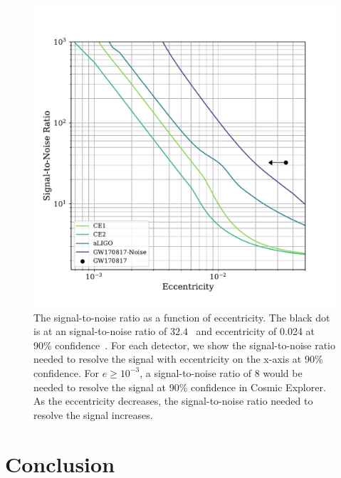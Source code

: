 \begin{figure}
    \includegraphics[width=1.1\columnwidth]{Figures/3G-bns-search-prospects/SNR-loglog-e7.pdf}
    \caption{The signal-to-noise ratio as a function of eccentricity. The black dot is at an signal-to-noise ratio of $32.4$~\cite{TheLIGOScientific:2017qsa} and eccentricity of 0.024 at 90\% confidence~\cite{Lenon:2020oza}. For each detector, we show the signal-to-noise ratio needed to resolve the signal with eccentricity on the x-axis at 90\% confidence. For $e \geq 10^{-3}$, a signal-to-noise ratio of 8 would be needed to resolve the signal at 90\% confidence in Cosmic Explorer. As the eccentricity decreases, the signal-to-noise ratio needed to resolve the signal increases.}
\label{Fig:SNRvEccen}
\end{figure}

\section{\label{s:3G-conc}Conclusion}

